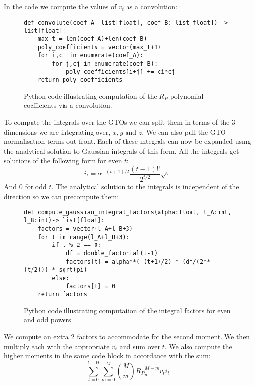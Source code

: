 In the code we compute the values of $v_t$ as a convolution:
\begin{figure}[H]
\begin{verbatim}
def convolute(coef_A: list[float], coef_B: list[float]) -> list[float]:
    max_t = len(coef_A)+len(coef_B)
    poly_coefficients = vector(max_t+1)
    for i,ci in enumerate(coef_A):
        for j,cj in enumerate(coef_B):
            poly_coefficients[i+j] += ci*cj
    return poly_coefficients
\end{verbatim}
    \caption{Python code illustrating computation of the $R_P$ polynomial coefficients via a convolution.}
\end{figure}


To compute the integrals over the GTOs we can split them in terms of the 3 dimensions we are integrating over, $x,y$ and $z$. We can also pull the GTO normalisation terms out front. 
Each of these integrals can now be expanded using the analytical solution to Gaussian integrals of this form. All the integrals get solutions of the following form for even $t$\cite[eq. 5.53]{daudel1983}:
\begin{equation}
    i_t = \alpha^{-(t+1)/2}\frac{(t-1)!!}{2^{t/2}}\sqrt{\pi}
\end{equation}
And 0 for odd $t$.
The analytical solution to the integrals is independent of the direction so we can precompute them: 
\begin{figure}[H]
\begin{verbatim}
def compute_gaussian_integral_factors(alpha:float, l_A:int, l_B:int)-> list[float]:
    factors = vector(l_A+l_B+3)
    for t in range(l_A+l_B+3):
        if t % 2 == 0:
            df = double_factorial(t-1)
            factors[t] = alpha**(-(t+1)/2) * (df/(2**(t/2))) * sqrt(pi)
        else:
            factors[t] = 0
    return factors
\end{verbatim}
    \caption{Python code illustrating computation of the integral factors for even and odd powers}
\end{figure}
We compute an extra $2$ factors to accommodate for the second moment. 
We then multiply each with the appropriate $v_t$ and sum over $t$\cite[eq. 5.49]{daudel1983}.
We also compute the higher moments\cite[sec. 5.2.2.5]{daudel1983} in the same code block in accordance with the sum:
\begin{equation}
    \sum_{t=0}^{l+M}\sum_{m=0}^M \binom{M}{m}{R_P}_u^{M-m}v_ti_t
\end{equation}
